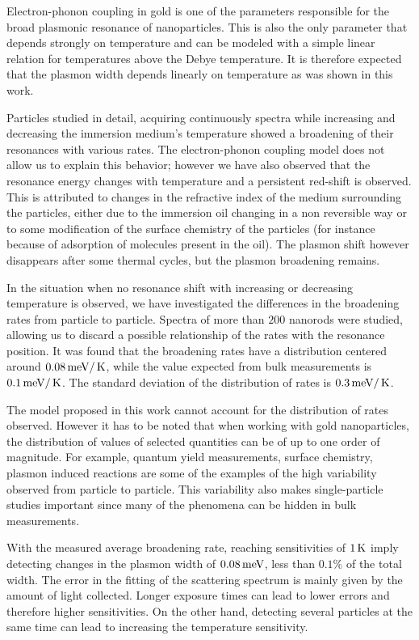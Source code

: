 Electron-phonon coupling in gold is one of the parameters responsible for
the broad plasmonic resonance of nanoparticles. This is also the only
parameter that depends strongly on temperature and can be modeled with a
simple linear relation for temperatures above the Debye temperature. It is
therefore expected that the plasmon width depends linearly on temperature as was
shown in this work. 

Particles studied in detail, acquiring continuously spectra while increasing and
decreasing the immersion medium's temperature showed a broadening of their
resonances with various rates. The electron-phonon coupling model does not allow
us to explain this behavior; however we have also observed that the resonance
energy changes with temperature and a persistent red-shift is observed. This is
attributed to changes in the refractive index of the medium surrounding the
particles, either due to the immersion oil changing in a non reversible way or
to some modification of the surface chemistry of the particles (for instance
because of adsorption of molecules present in the oil). The plasmon shift
however disappears after some thermal cycles, but the plasmon broadening
remains.

In the situation when no resonance shift with increasing or decreasing
temperature is observed, we have investigated the differences in the broadening
rates from particle to particle. Spectra of more than $200$ nanorods were
studied, allowing us to discard a possible relationship of the rates with the
resonance position. It was found that the broadening rates have a distribution
centered around $0.08\,\textrm{meV}/\,\textrm{K}$, while the value expected from bulk measurements
is $0.1\,\textrm{meV}/\,\textrm{K}$\cite{McKay1976}. The standard deviation of the distribution of
rates is $0.3\,\textrm{meV}/\,\textrm{K}$.

The model proposed in this work cannot account for the distribution of rates
observed. However it has to be noted that when working with gold nanoparticles,
the distribution of values of selected quantities can be of up to one order of
magnitude. For example, quantum yield measurements\cite{Yorulmaz2012}, surface
chemistry\cite{Carattino2016}, plasmon induced reactions\cite{Osinkina2013} are
some of the examples of the high variability observed from particle to particle.
This variability also makes single-particle studies important since many of the
phenomena can be hidden in bulk measurements\cite{Link1999b}.

With the measured average broadening rate, reaching sensitivities of $1\,\textrm{K}$ imply
detecting changes in the plasmon width of $0.08\,\textrm{meV}$, less than $0.1\%$ of the
total width. The error in the fitting of the scattering spectrum is mainly given
by the amount of light collected. Longer exposure times can lead to lower errors
and therefore higher sensitivities. On the other hand, detecting several
particles at the same time can lead to increasing the temperature sensitivity.

